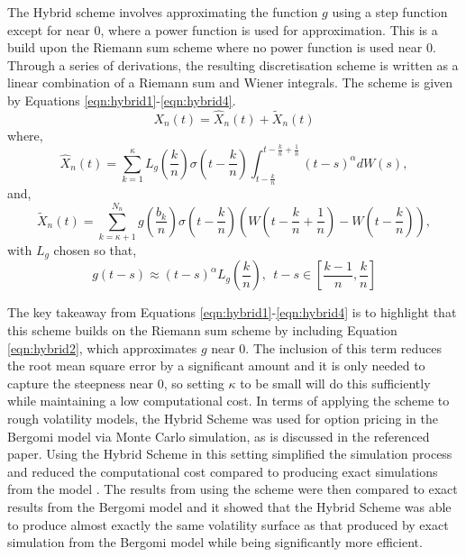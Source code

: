 \documentclass[12pt,oneside]{article}
\begin{document}
The Hybrid scheme involves approximating the function $g$ using a step function except for near 0, where a power function is used for approximation. This is a build upon the Riemann sum scheme where no power function is used near 0. Through a series of derivations, the resulting discretisation scheme is written as a linear combination of a Riemann sum and Wiener integrals. The scheme is given by Equations
\ref{eqn:hybrid1}-\ref{eqn:hybrid4}.  
\begin{equation}
\label{eqn:hybrid1}
X_n(t) = \hat{X}_n(t) + \tilde{X}_n(t)
\end{equation}
where,
\begin{equation}
\label{eqn:hybrid2}
\hat{X}_n(t) = \sum_{k=1}^{\kappa} L_g(\frac{k}{n}) \sigma (t-\frac{k}{n}) \int_{t-\frac{k}{n}}^{t-\frac{k}{n}+\frac{1}{n}}(t-s)^\alpha dW(s),
\end{equation}
and,
\begin{equation}
\label{eqn:hybrid3}
\tilde{X}_n(t)=\sum_{k=\kappa+1}^{N_n}g(\frac{b_k}{n})\sigma(t-\frac{k}{n})(W(t-\frac{k}{n}+\frac{1}{n})-W(t-\frac{k}{n})),
\end{equation}
with $L_g$ chosen so that,
\begin{equation}
\label{eqn:hybrid4}
g(t-s) \approx (t-s)^\alpha L_g(\frac{k}{n}), \ \ t-s \in [\frac{k-1}{n},\frac{k}{n}]
\end{equation}

The key takeaway from Equations \ref{eqn:hybrid1}-\ref{eqn:hybrid4} is to highlight that this scheme builds on the Riemann sum scheme by including Equation \ref{eqn:hybrid2}, which approximates $g$ near 0. The inclusion of this term reduces the root mean square error by a significant amount and it is only needed to capture the steepness near 0, so setting $\kappa$ to be small will do this sufficiently while maintaining a low computational cost. In terms of applying the scheme to rough volatility models, the Hybrid Scheme was used for option pricing in the Bergomi model via Monte Carlo simulation, as is discussed in the referenced paper. Using the Hybrid Scheme in this setting simplified the simulation process and reduced the computational cost compared to producing exact simulations from the model \cite[Page~20]{Bennedsen2017}. The results from using the scheme were then compared to exact results from the Bergomi model and it showed that the Hybrid Scheme was able to produce almost exactly the same volatility surface as that produced by exact simulation from the Bergomi model while being significantly more efficient.
\end{document}
